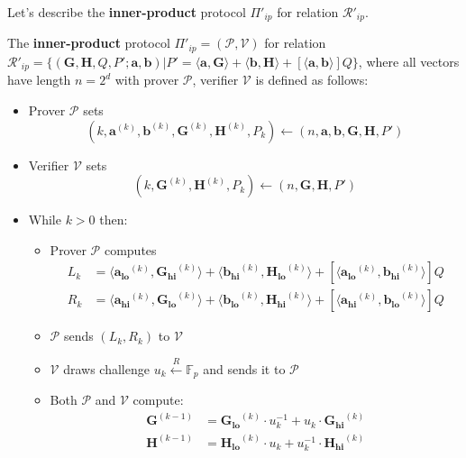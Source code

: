 \documentclass[../lecture-notes-148x210.tex]{subfiles}
\begin{document}
Let's describe the \textbf{inner-product} protocol $\Pi'_{ip}$ for relation $\mathcal{R}'_{ip}$. 
\begin{definition}
    The \textbf{inner-product} protocol $\Pi'_{ip} = (\mathcal{P}, \mathcal{V})$ for relation $\mathcal{R}'_{ip} = \{ (\mathbf{G,H}, Q, P'; \mathbf{a,b}) \vert P' = \langle \mathbf{a,G} \rangle + \langle \mathbf{b,H} \rangle + [\langle \mathbf{a,b} \rangle]Q \}$, where all vectors have length $n=2^d$ with prover $\mathcal{P}$, verifier $\mathcal{V}$ is defined as follows:
    \begin{itemize}
        \item Prover $\mathcal{P}$ sets $$(k, \mathbf{a}^{(k)}, \mathbf{b}^{(k)}, \mathbf{G}^{(k)}, \mathbf{H}^{(k)}, P_k) \gets (n, \mathbf{a,b,G,H},P')$$
        \item Verifier $\mathcal{V}$ sets $$(k, \mathbf{G}^{(k)}, \mathbf{H}^{(k)}, P_k) \gets (n, \mathbf{G,H},P')$$
        \item While $k > 0$ then:
            \begin{itemize}
                \item Prover $\mathcal{P}$ computes 
                    \begin{align*}
                        L_{k} &= \langle \mathbf{a_{lo}}^{(k)}, \mathbf{G_{hi}}^{(k)}\rangle + \langle \mathbf{b_{hi}}^{(k)}, \mathbf{H_{lo}}^{(k)}\rangle + [\langle \mathbf{a_{lo}}^{(k)}, \mathbf{b_{hi}}^{(k)}\rangle]Q \\
                        R_{k} &= \langle \mathbf{a_{hi}}^{(k)}, \mathbf{G_{lo}}^{(k)}\rangle + \langle \mathbf{b_{lo}}^{(k)}, \mathbf{H_{hi}}^{(k)}\rangle + [\langle \mathbf{a_{hi}}^{(k)}, \mathbf{b_{lo}}^{(k)}\rangle]Q
                    \end{align*}
                \item $\mathcal{P}$ sends $(L_k, R_k)$ to $\mathcal{V}$
                \item $\mathcal{V}$ draws challenge $u_k \xleftarrow{R} \mathbb{F}_p$ and sends it to $\mathcal{P}$
                \item Both $\mathcal{P}$ and $\mathcal{V}$ compute:
                    \begin{align*}
                        \mathbf{G}^{(k-1)} &= \mathbf{G_{lo}}^{(k)} \cdot u_k^{-1} + u_k \cdot \mathbf{G_{hi}}^{(k)} \\
                        \mathbf{H}^{(k-1)} &= \mathbf{H_{lo}}^{(k)} \cdot u_k + u_k^{-1} \cdot \mathbf{H_{hi}}^{(k)}
                    \end{align*}

\end{itemize}
\end{itemize}
\end{definition}
\end{document}
